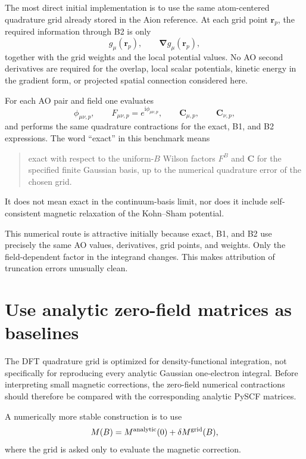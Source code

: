 \documentclass[11pt]{article}
\newcommand{\ii}{\mathrm{i}}
\newcommand{\vect}[1]{\bm{#1}}
\begin{document}
The most direct initial implementation is to use the same atom-centered quadrature grid already stored in the Aion reference.  At each grid point $\vect r_p$, the required information through B2 is only
\begin{equation}
g_\mu(\vect r_p),
\qquad
\vect\nabla g_\mu(\vect r_p),
\end{equation}
together with the grid weights and the local potential values.  No AO second derivatives are required for the overlap, local scalar potentials, kinetic energy in the gradient form, or projected spatial connection considered here.

For each AO pair and field one evaluates
\begin{equation}
\phi_{\mu\nu,p},
\qquad
F_{\mu\nu,p}=e^{\ii\phi_{\mu\nu,p}},
\qquad
\vect C_{\mu,p},
\qquad
\vect C_{\nu,p},
\end{equation}
and performs the same quadrature contractions for the exact, B1, and B2 expressions.  The word ``exact'' in this benchmark means
\begin{quote}
exact with respect to the uniform-$B$ Wilson factors $F^B$ and $\vect C$ for the specified finite Gaussian basis, up to the numerical quadrature error of the chosen grid.
\end{quote}
It does not mean exact in the continuum-basis limit, nor does it include self-consistent magnetic relaxation of the Kohn--Sham potential.

This numerical route is attractive initially because exact, B1, and B2 use precisely the same AO values, derivatives, grid points, and weights.  Only the field-dependent factor in the integrand changes.  This makes attribution of truncation errors unusually clean.

\section{Use analytic zero-field matrices as baselines}

The DFT quadrature grid is optimized for density-functional integration, not specifically for reproducing every analytic Gaussian one-electron integral.  Before interpreting small magnetic corrections, the zero-field numerical contractions should therefore be compared with the corresponding analytic PySCF matrices.

A numerically more stable construction is to use
\begin{equation}
M(B)=M^{\rm analytic}(0)+\delta M^{\rm grid}(B),
\end{equation}
where the grid is asked only to evaluate the magnetic correction.
\end{document}
